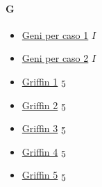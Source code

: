 	\paragraph{G} \hypertarget{SG}{}
		\begin{itemize}
		
			\item \href{https://mega.nz/#F!OhU10ZiJ!em1oocH75P3EPrnMP9fIzQ} {Geni per caso 1}  $I$ \\ 
			\item \href{https://mega.nz/#F!SxtjgLqD!Se9sf5DMj_xP7tjf07FYRg} {Geni per caso 2}  $I$ \\ 
			\item \href{https://mega.nz/#F!zzBGEQpD!FP10iLfrN_BN0na671FsBA} {Griffin 1}  $\oldstylenums{5}$ \\
			\item \href{https://mega.nz/#F!S7pAGTjL!xTgPY4kEqZI8MfJhOG78tg} {Griffin 2}  $\oldstylenums{5}$ \\
			\item \href{https://mega.nz/#F!6qRVzIRI!aGSsFOOfPaktZIlL_1-I3Q} {Griffin 3}  $\oldstylenums{5}$ \\
			\item \href{https://mega.nz/#F!Kr4hTDYQ!HZU0Z7oDJT4TWK7v3gY3_g} {Griffin 4}  $\oldstylenums{5}$ \\
			\item \href{https://mega.nz/#F!SzpAjTyC!CT1KhHm_ZnQNSGI2k1eOoQ} {Griffin 5}  $\oldstylenums{5}$ \\
		
	\end{itemize}	
	
